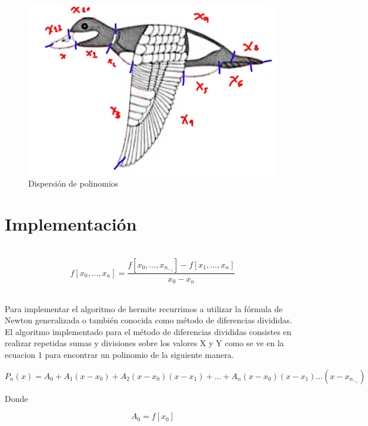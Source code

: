 \documentclass{article}
\begin{document}
\begin{figure}[h!]
\centering
\includegraphics[scale=0.2]{pato2(1).png}
\caption{Dispersión de polinomios}
\label{fig:fisica}
\end{figure}

\newpage

\section{Implementación}
\\
\begin{equation} \label{Diferencias divididas}
f[x_0,...,x_n] = \frac{f[x_0,...,x_n_-_1]-f[x_1,...,x_n]}{x_0-x_n}
\end{equation}

\\
Para implementar el algoritmo de hermite recurrimos a utilizar la fórmula de Newton generalizada o también conocida como método de diferencias divididas.\\
El algoritmo implementado para el método de diferencias divididas consistes en realizar repetidas sumas y divisiones sobre los valores X y Y como se ve en la ecuacion 1 para encontrar un polinomio de la siguiente manera.


\begin{equation} \label{eu_eqn}
P_n(x) = A_0+A_1(x-x_0)+A_2(x-x_0)(x-x_1)+...+A_n(x-x_0)(x-x_1)...(x-x_n_-_1)
\end{equation}

Donde

\begin{equation} \label{eu_eqn}
A_0 = f[x_0]
\end{equation}
\end{document}
